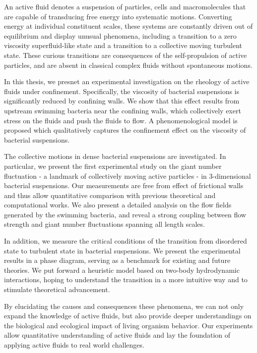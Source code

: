 An active fluid denotes a suspension of particles, cells and macromolecules that are capable of transducing free energy into systematic motions. Converting energy at individual constituent scales, these systems are constantly driven out of equilibrium and display unusual phenomena, including a transition to a zero viscosity superfluid-like state and a transition to a collective moving turbulent state. These curious transitions are consequences of the self-propulsion of active particles, and are absent in classical complex fluids without spontaneous motions.

In this thesis, we presnet an experimental investigation on the rheology of active fluids under confinement. Specifically, the viscosity of bacterial suspensions is significantly reduced by confining walls. We show that this effect results from upstream swimming bacteria near the confining walls, which collectively exert stress on the fluids and push the fluids to flow. A phenomenological model is proposed which qualitatively captures the confinement effect on the viscosity of bacterial suspensions.

The collective motions in dense bacterial suspensions are investigated. In particular, we present the first experimental study on the giant number fluctuation - a landmark of collectively moving active particles - in 3-dimensional bacterial suspensions. Our measurements are free from effect of frictional walls and thus allow quantitative comparison with previous theoretical and computational works. We also present a detailed analysis on the flow fields generated by the swimming bacteria, and reveal a strong coupling between flow strength and giant number fluctuations spanning all length scales.

In addition, we measure the critical conditions of the transition from disordered state to turbulent state in bacterial suspensions. We present the experimental results in a phase diagram, serving as a benchmark for existing and future theories. We put forward a heuristic model based on two-body hydrodynamic interactions, hoping to understand the transition in a more intuitive way and to stimulate theoretical advancement.

By elucidating the causes and consequences these phenomena, we can not only expand the knowledge of active fluids, but also provide deeper understandings on the biological and ecological impact of living organism behavior. Our experiments allow quantitative understanding of active fluids and lay the foundation of applying active fluids to real world challenges.
